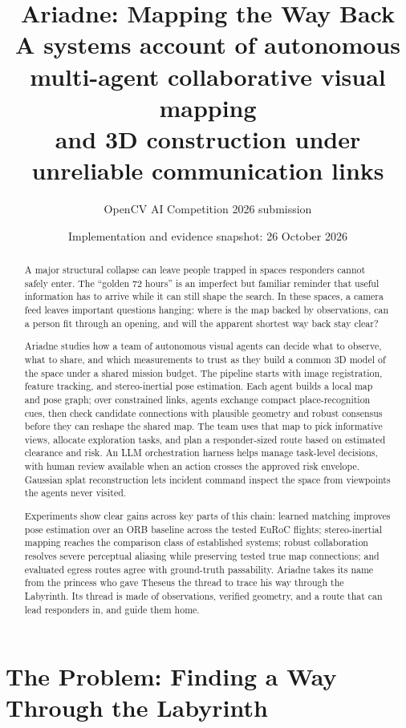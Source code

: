\documentclass[10pt,a4paper]{article}
\title{\textbf{Ariadne: Mapping the Way Back}\\[0.3em]
\large A systems account of autonomous multi-agent collaborative visual mapping \\ and 3D construction under unreliable communication links}
\author{OpenCV AI Competition 2026 submission}
\date{Implementation and evidence snapshot: 26 October 2026}
\begin{document}
\maketitle

\begin{abstract}
A major structural collapse can leave people trapped in spaces responders cannot safely enter. The “golden 72 hours” is an imperfect but familiar reminder that useful information has to arrive while it can still shape the search. In these spaces, a camera feed leaves important questions hanging: where is the map backed by observations, can a person fit through an opening, and will the apparent shortest way back stay clear?

Ariadne studies how a team of autonomous visual agents can decide what to observe, what to share, and which measurements to trust as they build a common 3D model of the space under a shared mission budget. The pipeline starts with image registration, feature tracking, and stereo-inertial pose estimation. Each agent builds a local map and pose graph; over constrained links, agents exchange compact place-recognition cues, then check candidate connections with plausible geometry and robust consensus before they can reshape the shared map. The team uses that map to pick informative views, allocate exploration tasks, and plan a responder-sized route based on estimated clearance and risk. An LLM orchestration harness helps manage task-level decisions, with human review available when an action crosses the approved risk envelope. Gaussian splat reconstruction lets incident command inspect the space from viewpoints the agents never visited.

Experiments show clear gains across key parts of this chain: learned matching improves pose estimation over an ORB baseline across the tested EuRoC flights; stereo-inertial mapping reaches the comparison class of established systems; robust collaboration resolves severe perceptual aliasing while preserving tested true map connections; and evaluated egress routes agree with ground-truth passability. Ariadne takes its name from the princess who gave Theseus the thread to trace his way through the Labyrinth. Its thread is made of observations, verified geometry, and a route that can lead responders in, and guide them home.
\end{abstract}

\section{The Problem: Finding a Way Through the Labyrinth}
\end{document}

